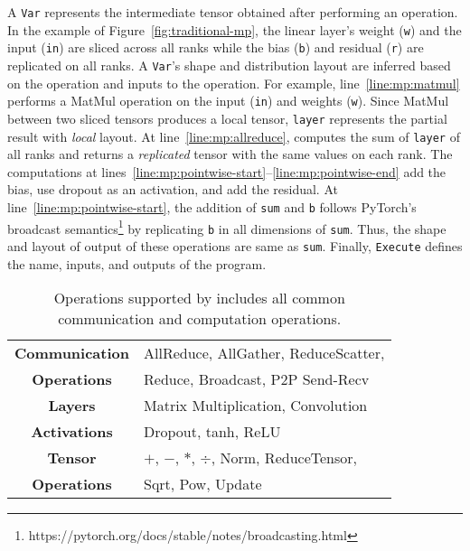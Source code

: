 A \texttt{Var} represents the intermediate tensor obtained after performing an operation. 
In the example of Figure~\ref{fig:traditional-mp}, the linear layer's weight (\texttt{w}) and the input
(\texttt{in}) are sliced across all ranks while the bias (\texttt{b}) and residual
(\texttt{r}) are replicated on all ranks. A \texttt{Var}'s shape and distribution layout are 
inferred based on the operation and inputs to the operation. For example,
line~\ref{line:mp:matmul} performs a MatMul operation on the input (\texttt{in}) and weights (\texttt{w}).
Since MatMul between two sliced tensors produces a local tensor, \texttt{layer} represents the partial result with \textit{local} layout.
At line~\ref{line:mp:allreduce}, \allreduce computes the sum of \texttt{layer} of all ranks and returns a \textit{replicated} tensor with the same values on each rank.
The computations at lines~\ref{line:mp:pointwise-start}--\ref{line:mp:pointwise-end} add the bias, use dropout as an activation, and add the residual. 
At line~\ref{line:mp:pointwise-start}, the addition of \texttt{sum} and \texttt{b} follows
PyTorch's broadcast semantics\footnote{https://pytorch.org/docs/stable/notes/broadcasting.html} by replicating \texttt{b} in all dimensions of \texttt{sum}. 
Thus, the shape and layout of output of these operations are same as \texttt{sum}.
Finally, \texttt{Execute} defines the name, inputs, and outputs of the program. 

\begin{table}
  \small
  \caption{Operations supported by \tool includes all common communication and computation operations. \label{tab:operations}}
  \begin{tabular}{|c|l|}
    \hline
    \textbf{Communication} & AllReduce, AllGather, ReduceScatter, \\
    \textbf{Operations}    & Reduce, Broadcast, P2P Send-Recv \\\hline
    \textbf{Layers} & Matrix Multiplication, Convolution\\ \hline
    \textbf{Activations} & Dropout, tanh, ReLU \\ \hline
    \textbf{Tensor} & $+$, $-$, $*$, $\div$, Norm, ReduceTensor,\\
    \textbf{Operations} & Sqrt, Pow, Update\\\hline 
  \end{tabular}
  \par \bigskip%
\end{table}

